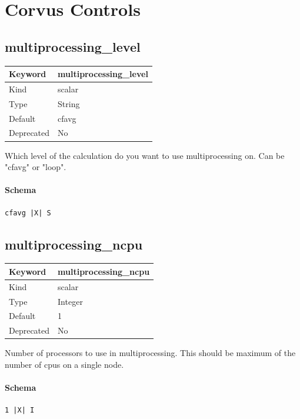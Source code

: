 \documentclass[11pt]{article}
\begin{document}
\section{Corvus Controls}

\subsection{multiprocessing\_level}
\label{kw:multiprocessing-level}
\begin{longtable}{|p{1.5in}|p{4.5in}|}
\hline
Keyword & multiprocessing\_level \\
\hline
Kind & scalar \\
\hline
Type & String \\
\hline
Default & cfavg \\
\hline
Deprecated & No \\
\hline
\end{longtable}
 Which level of the calculation do you want to use multiprocessing on.
 Can be "cfavg" or "loop".

\paragraph{Schema}
\begin{Verbatim}
cfavg |X| S
\end{Verbatim}

\subsection{multiprocessing\_ncpu}
\label{kw:multiprocessing-ncpu}
\begin{longtable}{|p{1.5in}|p{4.5in}|}
\hline
Keyword & multiprocessing\_ncpu \\
\hline
Kind & scalar \\
\hline
Type & Integer \\
\hline
Default & 1 \\
\hline
Deprecated & No \\
\hline
\end{longtable}
 Number of processors to use in multiprocessing.
 This should be maximum of the number of cpus on a single
 node.

\paragraph{Schema}
\begin{Verbatim}
1 |X| I
\end{Verbatim}
\end{document}

